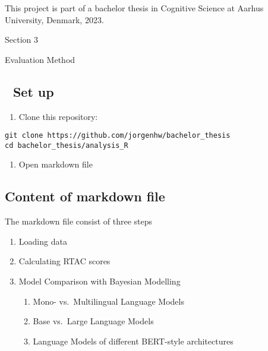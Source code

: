 \documentclass[
]{article}
\providecommand{\tightlist}{%
  \setlength{\itemsep}{0pt}\setlength{\parskip}{0pt}}
\begin{document}
This project is part of a bachelor thesis in Cognitive Science at Aarhus
University, Denmark, 2023.

Section 3

Evaluation Method

\hypertarget{set-up-2}{%
\subsection{🔧 Set up}\label{set-up-2}}

\begin{enumerate}
\def\labelenumi{\arabic{enumi}.}
\tightlist
\item
  Clone this repository:
\end{enumerate}

\begin{verbatim}
git clone https://github.com/jorgenhw/bachelor_thesis
cd bachelor_thesis/analysis_R
\end{verbatim}

\begin{enumerate}
\def\labelenumi{\arabic{enumi}.}
\setcounter{enumi}{1}
\tightlist
\item
  Open markdown file
\end{enumerate}

\hypertarget{content-of-markdown-file}{%
\subsection{Content of markdown file}\label{content-of-markdown-file}}

The markdown file consist of three steps

\begin{enumerate}
\def\labelenumi{\arabic{enumi}.}
\tightlist
\item
  Loading data
\item
  Calculating RTAC scores
\item
  Model Comparison with Bayesian Modelling

  \begin{enumerate}
  \def\labelenumii{\arabic{enumii}.}
  \tightlist
  \item
    Mono- vs.~Multilingual Language Models
  \item
    Base vs.~Large Language Models
  \item
    Language Models of different BERT-style architectures
  \end{enumerate}
\end{enumerate}
\end{document}
